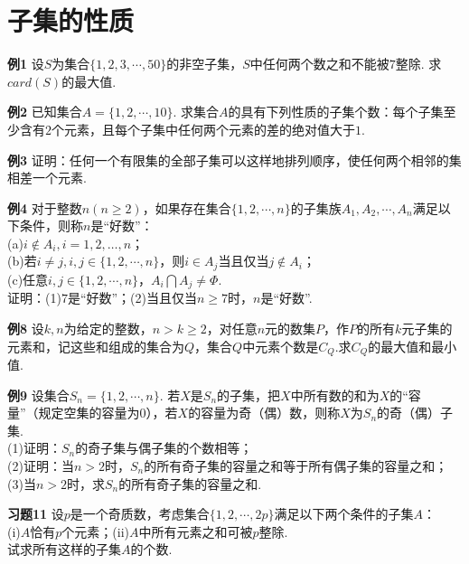 \documentclass[lang=cn, zihao=4.5]{elegantbook}
\begin{document}
\newpage
\section{子集的性质}

\newpage
\noindent %
	\textbf{例1} \quad 设$S$为集合$\{1,2,3, \cdots ,50\}$的非空子集，$S$中任何两个数之和不能被$7$整除. 求$card(S)$的最大值.
	
\vspace{30em}
\noindent %
	\textbf{例2} \quad 已知集合$A=\{1,2, \cdots ,10\}$. 求集合$A$的具有下列性质的子集个数：每个子集至少含有$2$个元素，且每个子集中任何两个元素的差的绝对值大于$1$.
	
\newpage
\noindent %
	\textbf{例3} \quad 证明：任何一个有限集的全部子集可以这样地排列顺序，使任何两个相邻的集相差一个元素.
	
\vspace{30em}
\noindent %
	\textbf{例4} \quad 对于整数$n(n \geq 2)$，如果存在集合$\{1,2, \cdots ,n\}$的子集族$A_1,A_2, \cdots ,A_n$满足以下条件，则称$n$是“好数”：\\
    (a)$i \notin A_i,i=1,2, \dots ,n$；\\
    (b)若$i \neq j,i,j \in \{1,2, \cdots ,n\}$，则$i \in A_j$当且仅当$j \notin A_i$；\\
    (c)任意$i,j \in \{1,2, \cdots ,n\}$，$A_i \bigcap A_j \neq \Phi$.\\
    证明：(1)$7$是“好数”；(2)当且仅当$n \geq 7$时，$n$是“好数”.

\newpage
\noindent %
	\textbf{例8} \quad 设$k,n$为给定的整数，$n>k \geq 2$，对任意$n$元的数集$P$，作$P$的所有$k$元子集的元素和，记这些和组成的集合为$Q$，集合$Q$中元素个数是$C_Q$.求$C_Q$的最大值和最小值.

\vspace{30em}
\noindent %
	\textbf{例9} \quad 设集合$S_n=\{1,2, \cdots ,n\}$. 若$X$是$S_n$的子集，把$X$中所有数的和为$X$的“容量”（规定空集的容量为$0$），若$X$的容量为奇（偶）数，则称$X$为$S_n$的奇（偶）子集. \\
    (1)证明：$S_n$的奇子集与偶子集的个数相等；\\
    (2)证明：当$n>2$时，$S_n$的所有奇子集的容量之和等于所有偶子集的容量之和；\\
    (3)当$n>2$时，求$S_n$的所有奇子集的容量之和.

\newpage
\noindent %
	\textbf{习题11} \quad 设$p$是一个奇质数，考虑集合$\{1,2, \cdots ,2p\}$满足以下两个条件的子集$A$：\\
    (i)$A$恰有$p$个元素；(ii)$A$中所有元素之和可被$p$整除.\\
    试求所有这样的子集$A$的个数.
    
\end{document}
